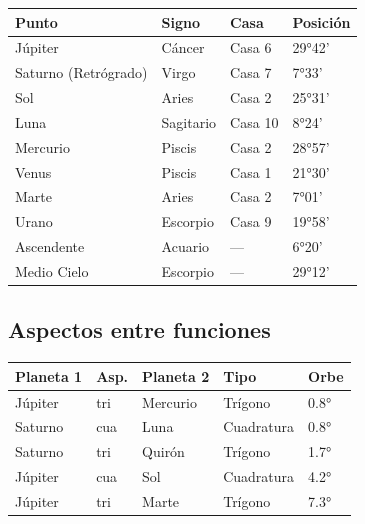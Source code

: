 \documentclass[11pt,a4paper]{article}
\begin{document}
\begin{center}
\begin{tabular}{llll}
\toprule
\textbf{Punto} & \textbf{Signo} & \textbf{Casa} & \textbf{Posición} \\
\midrule

Júpiter &
Cáncer &
Casa 6 &
29°42' \\

Saturno (Retrógrado) &
Virgo &
Casa 7 &
7°33' \\

Sol &
Aries &
Casa 2 &
25°31' \\

Luna &
Sagitario &
Casa 10 &
8°24' \\

Mercurio &
Piscis &
Casa 2 &
28°57' \\

Venus &
Piscis &
Casa 1 &
21°30' \\

Marte &
Aries &
Casa 2 &
7°01' \\

Urano &
Escorpio &
Casa 9 &
19°58' \\

Ascendente &
Acuario &
--- &
6°20' \\

Medio Cielo &
Escorpio &
--- &
29°12' \\

\bottomrule
\end{tabular}
\end{center}

\vspace{0.8cm}

\subsection*{Aspectos entre funciones}

\begin{center}
\begin{tabular}{lllll}
  \toprule
  \textbf{Planeta 1} & \textbf{Asp.} & \textbf{Planeta 2} & \textbf{Tipo} & \textbf{Orbe} \\
  \midrule
  Júpiter & tri & Mercurio & Trígono & 0.8° \\
  Saturno & cua & Luna & Cuadratura & 0.8° \\
  Saturno & tri & Quirón & Trígono & 1.7° \\
  Júpiter & cua & Sol & Cuadratura & 4.2° \\
  Júpiter & tri & Marte & Trígono & 7.3° \\
  \bottomrule
\end{tabular}
\end{center}
\end{document}

